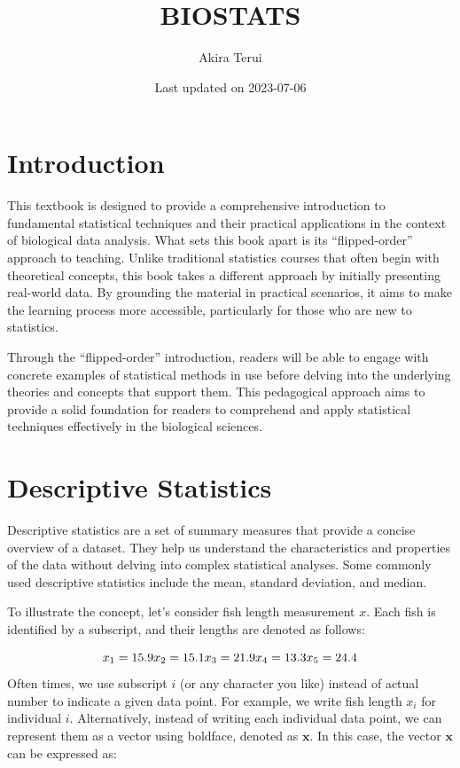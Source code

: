 \documentclass[
]{article}
\title{BIOSTATS}
\author{Akira Terui}
\date{Last updated on 2023-07-06}
\begin{document}
\maketitle

{
\setcounter{tocdepth}{2}
\tableofcontents
}
\hypertarget{introduction}{%
\section*{Introduction}\label{introduction}}

This textbook is designed to provide a comprehensive introduction to fundamental statistical techniques and their practical applications in the context of biological data analysis. What sets this book apart is its ``flipped-order'' approach to teaching. Unlike traditional statistics courses that often begin with theoretical concepts, this book takes a different approach by initially presenting real-world data. By grounding the material in practical scenarios, it aims to make the learning process more accessible, particularly for those who are new to statistics.

Through the ``flipped-order'' introduction, readers will be able to engage with concrete examples of statistical methods in use before delving into the underlying theories and concepts that support them. This pedagogical approach aims to provide a solid foundation for readers to comprehend and apply statistical techniques effectively in the biological sciences.

\hypertarget{descriptive-statistics}{%
\section{Descriptive Statistics}\label{descriptive-statistics}}

Descriptive statistics are a set of summary measures that provide a concise overview of a dataset. They help us understand the characteristics and properties of the data without delving into complex statistical analyses. Some commonly used descriptive statistics include the mean, standard deviation, and median.

To illustrate the concept, let's consider fish length measurement \(x\). Each fish is identified by a subscript, and their lengths are denoted as follows:

\[
x_1 = 15.9\\
x_2 = 15.1\\
x_3 = 21.9\\
x_4 = 13.3\\
x_5 = 24.4\\
\] Often times, we use subscript \(i\) (or any character you like) instead of actual number to indicate a given data point. For example, we write fish length \(x_i\) for individual \(i\). Alternatively, instead of writing each individual data point, we can represent them as a vector using boldface, denoted as \(\pmb{x}\). In this case, the vector \(\pmb{x}\) can be expressed as:
\end{document}
